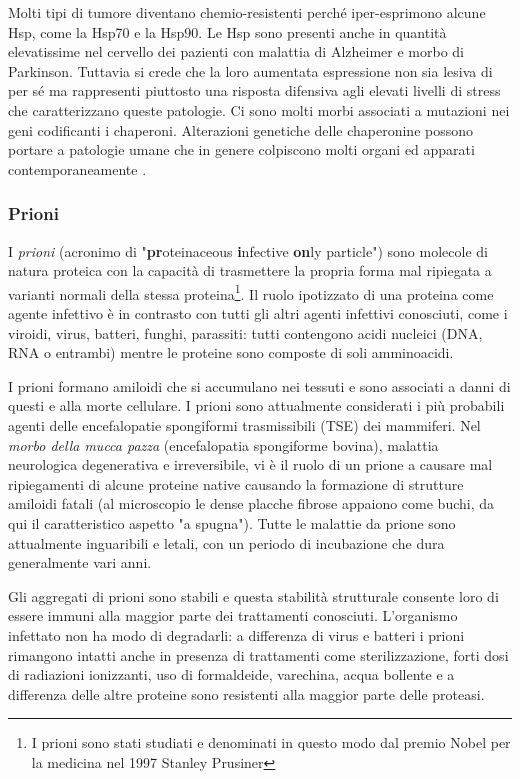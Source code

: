{Molti tipi di tumore diventano chemio-resistenti perché iper-esprimono alcune Hsp, come la Hsp70 e la Hsp90. Le Hsp sono presenti anche in quantità elevatissime nel cervello dei pazienti con malattia di Alzheimer e morbo di Parkinson. Tuttavia si crede che la loro aumentata espressione non sia lesiva di per sé ma rappresenti piuttosto una risposta difensiva agli elevati livelli di stress che caratterizzano queste patologie. Ci sono molti morbi associati a mutazioni nei geni codificanti i chaperoni. Alterazioni genetiche delle chaperonine possono portare a patologie umane che in genere colpiscono molti organi ed apparati contemporaneamente \supercite{chaperoninaWiki}. \\


\subsubsection{Prioni}
\par I \textit{prioni} (acronimo di "\textbf{pr}oteinaceous \textbf{i}nfective \textbf{on}ly particle") sono molecole di natura proteica con la capacità di trasmettere la propria forma mal ripiegata a varianti normali della stessa proteina\footnote{I prioni sono stati studiati e denominati in questo modo dal premio Nobel per la medicina nel 1997 Stanley Prusiner\supercite{prusiner1998prion}}. Il ruolo ipotizzato di una proteina come agente infettivo è in contrasto con tutti gli altri agenti infettivi conosciuti, come i viroidi, virus, batteri, funghi, parassiti: tutti contengono acidi nucleici (DNA, RNA o entrambi) mentre le proteine sono composte di soli amminoacidi.

\par I prioni formano amiloidi che si accumulano nei tessuti e sono associati a danni di questi e alla morte cellulare. I prioni sono attualmente considerati i più probabili agenti delle encefalopatie spongiformi trasmissibili (TSE) dei mammiferi. Nel \textit{morbo della mucca pazza} (encefalopatia spongiforme bovina), malattia neurologica degenerativa e irreversibile, vi è il ruolo di un prione a causare mal ripiegamenti di alcune proteine native causando la formazione di strutture amiloidi fatali (al microscopio le dense placche fibrose appaiono come buchi, da qui il caratteristico aspetto "a spugna"). Tutte le malattie da prione sono attualmente inguaribili e letali, con un periodo di incubazione che dura generalmente vari anni.

\par Gli aggregati di prioni sono stabili e questa stabilità strutturale consente loro di essere immuni alla maggior parte dei trattamenti conosciuti. L'organismo infettato non ha modo di degradarli: a differenza di virus e batteri i prioni rimangono intatti anche in presenza di trattamenti come sterilizzazione, forti dosi di radiazioni ionizzanti, uso di formaldeide, varechina, acqua bollente e a differenza delle altre proteine sono resistenti alla maggior parte delle proteasi.

}
